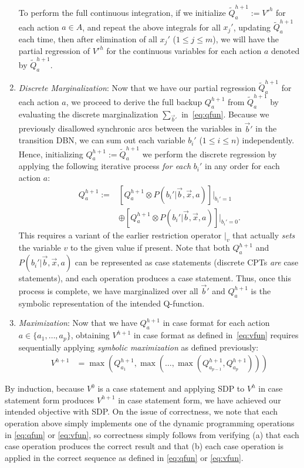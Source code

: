 \documentclass[letterpaper]{article}
\begin{document}
\begin{enumerate}
To perform the full continuous integration, 
if we initialize 
$\tilde{Q}_a^{h+1} := V'^{h}$ for each action $a \in A$, and repeat
the above integrals for all $x_j'$, updating $\tilde{Q}_a^{h+1}$ each time,
then after elimination of all $x_j'$ ($1 \leq j \leq m$), we will have 
the partial regression of $V'^{h}$ for the continuous variables for
each action $a$ denoted by $\tilde{Q}_a^{h+1}$.
\item {\it Discrete Marginalization}: Now that we have our partial
regression $\tilde{Q}_a^{h+1}$ for each action $a$, we proceed
to derive the full backup $Q_a^{h+1}$ from $\tilde{Q}_a^{h+1}$
by evaluating the discrete 
marginalization $\sum_{\vec{b}'}$ in~\eqref{eq:qfun}.
Because we previously disallowed synchronic arcs
between the variables in $\vec{b}'$ 
in the transition DBN, we can sum out each variable $b_i'$ ($1 \leq i \leq n$) 
independently.  Hence, initializing
$Q_a^{h+1} := \tilde{Q}_a^{h+1}$
we perform the discrete regression by applying the following iterative
process \emph{for each} $b_i'$ in any order
for each action $a$:
\begin{align}
Q_a^{h+1} := & \left[ Q_a^{h+1} \otimes P(b_i'|\vec{b},\vec{x},a) \right]|_{b_i' = 1} \nonumber \\
 & \oplus \left[ Q_a^{h+1} \otimes P(b_i'|\vec{b},\vec{x},a) \right]|_{b_i' = 0}.
\end{align}
This requires a variant of the earlier restriction operator $|_v$ that
actually \emph{sets} the variable $v$ to the given value if present.
Note that both $Q_a^{h+1}$ and $P(b_i'|\vec{b},\vec{x},a)$ can be represented
as case statements (discrete CPTs \emph{are} case statements), 
and each operation produces a case statement.
Thus, once this process is complete, we have marginalized over
all $\vec{b}'$ and $Q_a^{h+1}$ is the symbolic representation
of the intended Q-function.
\item {\it Maximization}: Now that we have $Q_a^{h+1}$ in
case format for each action $a \in \{a_1,\ldots,a_p\}$, obtaining
$V^{h+1}$ in case format as defined in~\eqref{eq:vfun} requires
sequentially applying
\emph{symbolic maximization} as defined previously:
\begin{align*}
V^{h+1} & = 
\max(Q_{a_1}^{h+1},\max(\ldots,\max(Q_{a_{p-1}}^{h+1},Q_{a_p}^{h+1})))
\end{align*}
\end{enumerate}
By induction, because $V^0$ is a case statement and applying
SDP to $V^h$ in case statement form produces $V^{h+1}$ in case
statement form, we have achieved our intended
objective with SDP.  On the issue of correctness,
we note that each operation above simply implements one of the
dynamic programming operations in \eqref{eq:qfun} or \eqref{eq:vfun}, 
so correctness simply follows from verifying (a) that each case
operation produces the correct result and that (b) each case operation
is applied in the correct sequence as defined in \eqref{eq:qfun} or 
\eqref{eq:vfun}.  
\end{document}
